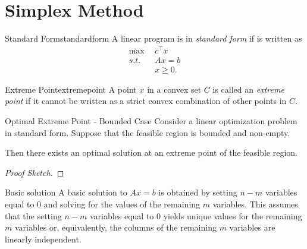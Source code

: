 

\chapter{Simplex Method}


\begin{definition}{Standard Form}{standardform}
A linear program is in \emph{standard form} if is written as 
\begin{align*}
\max \ \ &c^\top x \\
s.t. \ \ & Ax = b\\
& x \geq 0.
\end{align*}
\end{definition}

\begin{definition}{Extreme Point}{extremepoint}
A point $x$ in a convex set $C$ is called an \emph{extreme point} if it cannot be written as a strict convex combination of other points in $C$.
\end{definition}

\begin{theorem}{Optimal Extreme Point - Bounded Case}{}
Consider a linear optimization problem in standard form.  Suppose that the feasible region is bounded and non-empty. 

Then there exists an optimal solution at an extreme point of the feasible region.
\end{theorem}

\begin{proof}[Proof Sketch]

\end{proof}


\begin{definition}{Basic solution}{}
A basic solution to $Ax = b$ is obtained by setting $n-m$ variables equal to $0$ and solving for the values of the remaining $m$ variables.  This assumes that the setting $n-m$ variables equal to 0 yields unique values for the remaining $m$ variables or, equivalently, the columns of the remaining $m$ variables are linearly independent.
\end{definition}


